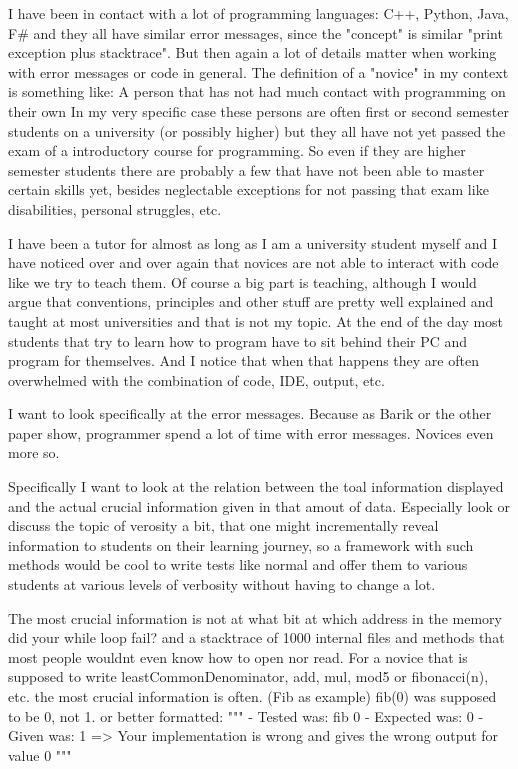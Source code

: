 \documentclass[
	bibliography=totoc,
	listof=totoc,
]{scrbook}
\begin{document}
\begin{justify}
I have been in contact with a lot of programming languages: C++, Python, Java, F\# and they all have similar error messages,
since the "concept" is similar "print exception plus stacktrace". But then again a lot of details matter when working with error messages or code in general.
The definition of a "novice" in my context is something like: A person that has not had much contact with programming on their own
In my very specific case these persons are often first or second semester students on a university (or possibly higher) but they all have not yet passed the exam of
a introductory course for programming. So even if they are higher semester students there are probably a few that have not been able to master certain skills yet,
besides neglectable exceptions for not passing that exam like disabilities, personal struggles, etc.

I have been a tutor for almost as long as I am a university student myself and I have noticed over and over again that novices are not able to interact with code
like we try to teach them. Of course a big part is teaching, although I would argue that conventions, principles and other stuff are pretty well explained and taught
at most universities and that is not my topic. At the end of the day most students that try to learn how to program have to sit behind their PC and program for themselves.
And I notice that when that happens they are often overwhelmed with the combination of code, IDE, output, etc.

I want to look specifically at the error messages. Because as Barik or the other paper show, programmer spend a lot of time with error messages.
Novices even more so.

Specifically I want to look at the relation between the toal information displayed and the actual crucial information given in that amout of data.
Especially look or discuss the topic of verosity a bit, that one might incrementally reveal information to students on their learning journey, so a framework with
such methods would be cool to write tests like normal and offer them to various students at various levels of verbosity without having to change a lot.

The most crucial information is not at what bit at which address in the memory did your while loop fail? and a stacktrace of 1000 internal files and methods that
most people wouldnt even know how to open nor read. For a novice that is supposed to write leastCommonDenominator, add, mul, mod5 or fibonacci(n), etc.
the most crucial information is often. (Fib as example)
fib(0) was supposed to be 0, not 1.
or better formatted:
"""
    - Tested was: fib 0
    - Expected was: 0
    - Given was: 1
    => Your implementation is wrong and gives the wrong output for value 0
"""


\end{justify}
\end{document}

